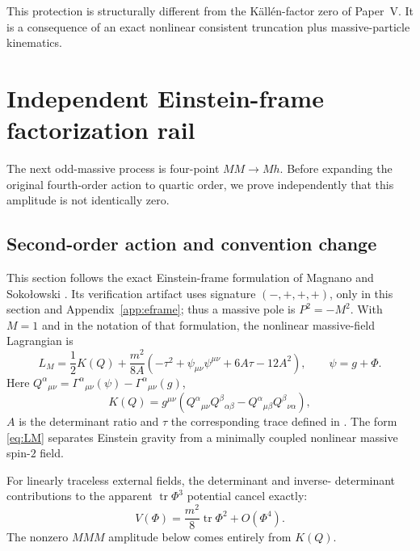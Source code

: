 \documentclass[11pt]{article}
\theoremstyle{definition}
\theoremstyle{remark}
\begin{document}
This protection is structurally different from the K\"all\'en-factor
zero of Paper~V.  It is a consequence of an exact nonlinear consistent
truncation plus massive-particle kinematics.

\section{Independent Einstein-frame factorization rail}
\label{sec:factorization}

The next odd-massive process is four-point $MM\to Mh$.  Before expanding
the original fourth-order action to quartic order, we prove independently
that this amplitude is not identically zero.

\subsection{Second-order action and convention change}

This section follows the exact Einstein-frame formulation of Magnano and
Soko\l{}owski \cite{MagnanoSokolowski}.  Its verification artifact uses
signature $(-,+,+,+)$, only in this section and Appendix~\ref{app:eframe};
thus a massive pole is $P^2=-M^2$.  With $M=1$ and in the notation of that
formulation, the nonlinear massive-field Lagrangian is
\begin{equation}\label{eq:LM}
L_M=\frac12K(Q)+\frac{m^2}{8A}
\left(-\tau^2+\psi_{\mu\nu}\psi^{\mu\nu}
+6A\tau-12A^2\right),
\qquad \psi=g+\Phi .
\end{equation}
Here $Q^\alpha{}_{\mu\nu}=\Gamma^\alpha{}_{\mu\nu}(\psi)
-\Gamma^\alpha{}_{\mu\nu}(g)$,
\begin{equation}
K(Q)=g^{\mu\nu}\left(
Q^\alpha{}_{\mu\nu}Q^\beta{}_{\alpha\beta}
-Q^\alpha{}_{\mu\beta}Q^\beta{}_{\nu\alpha}\right),
\end{equation}
$A$ is the determinant ratio and $\tau$ the corresponding trace defined
in \cite{MagnanoSokolowski}.  The form \eqref{eq:LM} separates Einstein
gravity from a minimally coupled nonlinear massive spin-$2$ field.

For linearly traceless external fields, the determinant and inverse-
determinant contributions to the apparent $\operatorname{tr}\Phi^3$
potential cancel exactly:
\begin{equation}\label{eq:potentialcancel}
V(\Phi)=\frac{m^2}{8}\operatorname{tr}\Phi^2+O(\Phi^4).
\end{equation}
The nonzero $MMM$ amplitude below comes entirely from $K(Q)$.
\end{document}

